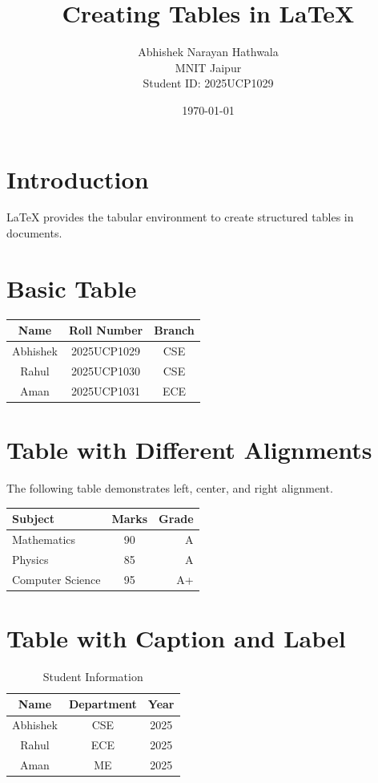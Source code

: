 \documentclass[12pt,a4paper]{article}
\title{Creating Tables in LaTeX}
\author{Abhishek Narayan Hathwala \\ MNIT Jaipur \\ Student ID: 2025UCP1029}
\date{\today}
\begin{document}
\maketitle

\section{Introduction}

LaTeX provides the tabular environment to create
structured tables in documents.

\section{Basic Table}

\begin{center}
\begin{tabular}{|c|c|c|}
\hline
Name & Roll Number & Branch \\
\hline
Abhishek & 2025UCP1029 & CSE \\
Rahul & 2025UCP1030 & CSE \\
Aman & 2025UCP1031 & ECE \\
\hline
\end{tabular}
\end{center}

\section{Table with Different Alignments}

The following table demonstrates left, center,
and right alignment.

\begin{center}
\begin{tabular}{|l|c|r|}
\hline
Subject & Marks & Grade \\
\hline
Mathematics & 90 & A \\
Physics & 85 & A \\
Computer Science & 95 & A+ \\
\hline
\end{tabular}
\end{center}

\section{Table with Caption and Label}

\begin{table}[h]
\centering
\caption{Student Information}
\label{tab:student}

\begin{tabular}{|c|c|c|}
\hline
Name & Department & Year \\
\hline
Abhishek & CSE & 2025 \\
Rahul & ECE & 2025 \\
Aman & ME & 2025 \\
\hline
\end{tabular}

\end{table}
\end{document}
